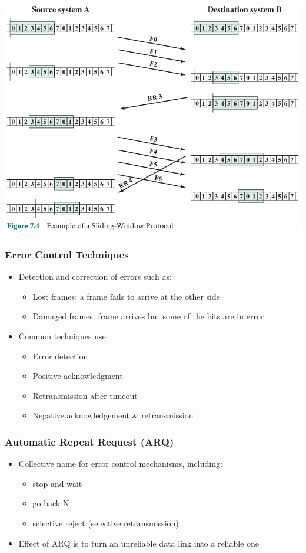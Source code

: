 \documentclass[pdflatex,compress]{beamer}
\begin{document}
\begin{frame}
	\begin{center}
		\includegraphics[width=0.8\linewidth]{img/img04}
	\end{center}
\end{frame}

\begin{frame}
	\frametitle{Error Control Techniques}
	\begin{itemize}
		\item Detection and correction of errors such as:
		\begin{itemize}
			\item Lost frames: a frame fails to arrive at the other side
			\item Damaged frames: frame arrives but some of the bits are in error
		\end{itemize}
		\item Common techniques use:
		\begin{itemize}
			\item Error detection
			\item Positive acknowledgment
			\item Retransmission after timeout
			\item Negative acknowledgement \& retransmission
		\end{itemize}
	\end{itemize}	
\end{frame}

\begin{frame}
	\frametitle{Automatic Repeat Request (ARQ)}
	\begin{itemize}
		\item Collective name for error control mechanisms, including:
		\begin{itemize}
			\item stop and wait
			\item go back N
			\item selective reject (selective retransmission)
		\end{itemize}
		\item Effect of ARQ is to turn an unreliable data link into a reliable one
	\end{itemize}
\end{frame}
\end{document}
